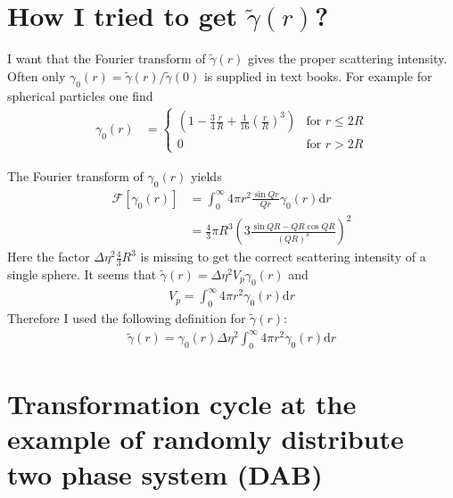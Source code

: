 \documentclass[12pt]{amsbook}
\begin{document}
\section{How I tried to get $\tilde{\gamma}(r)$?}
I want that the Fourier transform of $\tilde{\gamma}(r)$ gives the proper scattering intensity. Often only $\gamma_0(r)=\tilde{\gamma}(r)/\tilde{\gamma}(0)$ is supplied in text books. For example for spherical particles one find
\begin{align}
\gamma_0(r) &=
\begin{cases}
  \left( 1-\frac{3}{4}\frac{r}{R}+\frac{1}{16}\left(\frac{r}{R}\right)^3\right) & \mbox{for } r\leq 2R \\
0 & \mbox{for }  r>2R
\end{cases}
\end{align}

The Fourier transform of $\gamma_0(r)$ yields
\begin{align}
\mathcal{F}[\gamma_0(r)] &= \int_0^\infty 4\pi r^2 \frac{\sin Qr}{Qr} \gamma_0(r) \mathrm{d}r 
\\ &= \frac43 \pi R^3 \left(3\frac{\sin QR -QR\cos QR}{(QR)^3}\right)^2
\end{align}
Here the factor $\Delta\eta^2\frac43 R^3$ is missing to get the correct scattering intensity of a single sphere.
It seems that  
$\tilde{\gamma}(r)=\Delta\eta^2 V_p\gamma_0(r)$ and 
\begin{align}
V_p=\int_0^\infty 4\pi r^2 \gamma_0(r) \mathrm{d}r
\end{align}
Therefore I used the following definition for $\tilde{\gamma}(r)$:
\begin{align}
\tilde{\gamma}(r)= \gamma_0(r) \Delta\eta^2 \int_0^\infty 4\pi r^2 \gamma_0(r) \mathrm{d}r
\end{align}



\section{Transformation cycle at the example of randomly distribute two phase system (DAB)}
\end{document}
